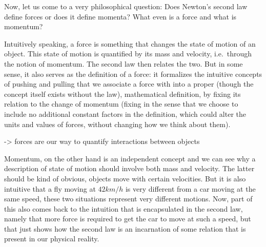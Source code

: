 \documentclass[../class_mech_main.tex]{subfiles}
\begin{document}


Now, let us come to a very philosophical question: Does Newton's second law define forces or does it define momenta? What even is a force and what is momentum?

Intuitively speaking, a force is something that changes the state of motion of an object. This state of motion is quantified by its mass and velocity, i.e.~through the notion of momentum. The second law then relates the two. But in some sense, it also serves as the definition of a force: it formalizes the intuitive concepts of pushing and pulling that we associate a force with into a proper (though the concept itself exists without the law), mathematical definition, by fixing its relation to the change of momentum (fixing in the sense that we choose to include no additional constant factors in the definition, which could alter the units and values of forces, without changing how we think about them).

-> forces are our way to quantify interactions between objects

Momentum, on the other hand is an independent concept and we can see why a description of state of motion should involve both mass and velocity. The latter should be kind of obvious, objects move with certain velocities. But it is also intuitive that a fly moving at $42 km/h$ is very different from a car moving at the same speed, these two situations represent very different motions.
Now, part of this also comes back to the intuition that is encapsulated in the second law, namely that more force is required to get the car to move at such a speed, but that just shows how the second law is an incarnation of some relation that is present in our physical reality. 
\end{document}
